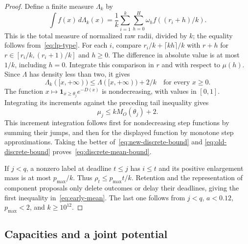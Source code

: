 \documentclass[11pt]{article}
\numberwithin{equation}{section}
\theoremstyle{definition}
\newcommand{\ind}{\mathbf 1}
\begin{document}
\begin{proof}
Define a finite measure $\Lambda_k$ by
\[
 \int f(x)\,d\Lambda_k(x)
 =\frac1k\sum_{i=1}^k\sum_{h=0}^H
       \omega_h f((r_i+h)/k).
\]
This is the total measure of normalized raw radii, divided by $k$;
the equality follows from~\eqref{eq:lp-type}.
For each $i$, compare $r_i/k+\lceil kh\rceil/k$ with $r+h$ for
$r\in[r_i/k,(r_i+1)/k]$ and $h\ge0$.
The difference in absolute value is at most $1/k$, including $h=0$.
Integrate this comparison in $r$ and with respect to $\mu(h)$.
Since $\Lambda$ has density less than two, it gives
\[
 \Lambda_k([x,+\infty))\le\Lambda([x,+\infty))+2/k
 \quad\text{for every }x\ge0.
\]
The function $x\mapsto\ind_{x\ge\theta_j}e^{-D(x)}$ is nondecreasing,
with values in $[0,1]$. Integrating its increments against the preceding
tail inequality gives
\begin{equation}\label{eq:old-discrete-bound}
 \mu_j\le kM_O(\theta_j)+2.
\end{equation}
This increment integration follows first for nondecreasing step
functions by summing their jumps, and then for the displayed function
by monotone step approximations.
Taking the better of~\eqref{eq:new-discrete-bound} and
\eqref{eq:old-discrete-bound} proves~\eqref{eq:discrete-mean-bound}.

If $j<q$, a nonzero label at deadline $t\le j$ has $i\le t$ and its
positive enlargement mass is at most $p_{\max}/k$. Thus
$\rho_t\le p_{\max}t/k$. Retention and the representation of component
proposals only delete outcomes or delay their deadlines, giving the first inequality
in~\eqref{eq:early-mean}. The last one follows from $j<q$,
$a<0.12$, $p_{\max}<2$, and $k\ge10^{12}$.
\end{proof}


\subsection{Capacities and a joint potential}
\end{document}
